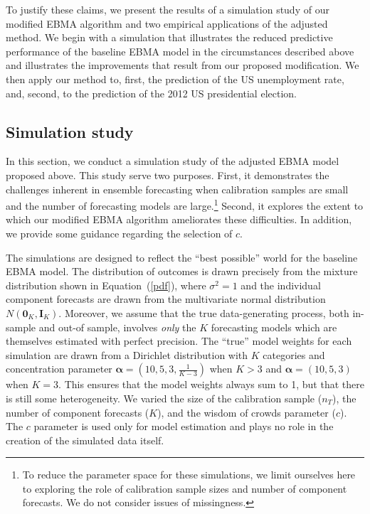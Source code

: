 \documentclass[12pt,fullpage,endnotes]{article}
\begin{document}
To justify these claims, we present the results of a
simulation study of our modified EBMA algorithm and two empirical
applications of the adjusted method. We begin with a simulation that
illustrates the reduced predictive performance of the baseline EBMA
model in the circumstances described above and illustrates the
improvements that result from our proposed modification.  We then
apply our method to, first, the prediction of the US unemployment
rate, and, second, to the prediction of the 2012 US presidential
election.

\subsection{Simulation study} 

In this section, we conduct a simulation study of the adjusted EBMA
model proposed above.  This study serve two purposes.  First,
it demonstrates the challenges inherent in ensemble forecasting when
calibration samples are small and the number of forecasting models are
large.\footnote{To reduce the parameter space for these simulations,
  we limit ourselves here to exploring the role of calibration sample
  sizes and number of component forecasts.  We do not consider issues
  of missingness.}  Second, it explores the extent to which our
modified EBMA algorithm ameliorates these difficulties.  In addition,
we provide some guidance regarding the selection of $c$.

The simulations are designed to reflect the ``best possible'' world
for the baseline EBMA model.  The distribution of outcomes is drawn
precisely from the mixture distribution shown in Equation~(\ref{pdf}),
where $\sigma^2 = 1$ and the individual component forecasts are drawn
from the multivariate normal distribution $N(\mathbf{0}_K,
\mathbf{I}_K)$.  Moreover, we assume that the true data-generating
process, both in-sample and out-of sample, involves \textit{only} the
$K$ forecasting models which are themselves estimated with perfect
precision. The ``true'' model weights for each simulation are drawn
from a Dirichlet distribution with $K$ categories and concentration
parameter $\mathbf{\alpha} = (10, 5, 3, \frac{1}{K-3})$ when $K>3$ and
$\mathbf{\alpha} = (10, 5, 3)$ when $K=3$. This ensures that the model
weights always sum to 1, but that there is still some heterogeneity.
We varied the size of the calibration sample ($n_T$), the number of
component forecasts ($K$), and the wisdom of crowds parameter
($c$). The $c$ parameter is used only for model estimation and plays
no role in the creation of the simulated data itself.
\end{document}
